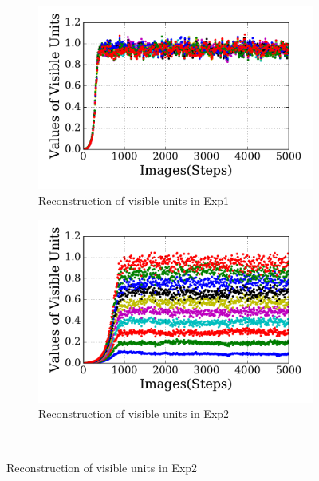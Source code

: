 \begin{figure}
\DIFdelendFL \DIFaddbeginFL \begin{subfigure}[t]{0.48\textwidth}
		\DIFaddendFL \includegraphics[width=\textwidth]{pics_sdlm/31_exp_RBM_noise/exp1_recon_s.pdf}
		\caption{Reconstruction of visible units in Exp1}
	\end{subfigure}
	\DIFdelbeginFL %
\DIFdelendFL \DIFaddbeginFL \begin{subfigure}[t]{0.48\textwidth}
		\DIFaddendFL \includegraphics[width=\textwidth]{pics_sdlm/31_exp_RBM_noise/exp2_recon_s.pdf}
		\caption{Reconstruction of visible units in Exp2}
	\end{subfigure}\\
	\DIFdelbeginFL %

\end{figure}
